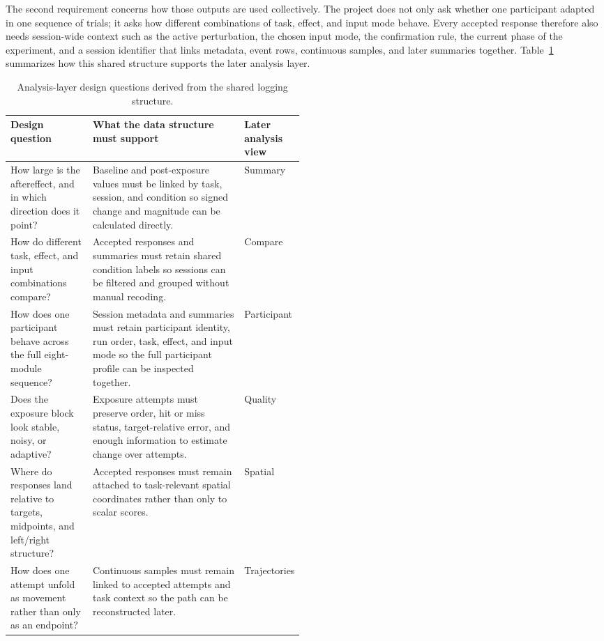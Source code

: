 The second requirement concerns how those outputs are used collectively. The project does not only ask whether one participant adapted in one sequence of trials; it asks how different combinations of task, effect, and input mode behave. Every accepted response therefore also needs session-wide context such as the active perturbation, the chosen input mode, the confirmation rule, the current phase of the experiment, and a session identifier that links metadata, event rows, continuous samples, and later summaries together. Table~\ref{tab:analysis-design-questions} summarizes how this shared structure supports the later analysis layer.

\begin{table}[H]
    \centering
    \footnotesize
    \setlength{\tabcolsep}{5pt}
    \renewcommand{\arraystretch}{1.18}
    \begin{tabularx}{\linewidth}{|
        >{\raggedright\arraybackslash}p{0.29\linewidth}|
        >{\raggedright\arraybackslash}X|
        >{\raggedright\arraybackslash}p{0.20\linewidth}|}
        \hline
        \textbf{Design question} & \textbf{What the data structure must support} & \textbf{Later analysis view} \\
        \hline
        How large is the aftereffect, and in which direction does it point? & Baseline and post-exposure values must be linked by task, session, and condition so signed change and magnitude can be calculated directly. & Summary \\
        \hline
        How do different task, effect, and input combinations compare? & Accepted responses and summaries must retain shared condition labels so sessions can be filtered and grouped without manual recoding. & Compare \\
        \hline
        How does one participant behave across the full eight-module sequence? & Session metadata and summaries must retain participant identity, run order, task, effect, and input mode so the full participant profile can be inspected together. & Participant \\
        \hline
        Does the exposure block look stable, noisy, or adaptive? & Exposure attempts must preserve order, hit or miss status, target-relative error, and enough information to estimate change over attempts. & Quality \\
        \hline
        Where do responses land relative to targets, midpoints, and left/right structure? & Accepted responses must remain attached to task-relevant spatial coordinates rather than only to scalar scores. & Spatial \\
        \hline
        How does one attempt unfold as movement rather than only as an endpoint? & Continuous samples must remain linked to accepted attempts and task context so the path can be reconstructed later. & Trajectories \\
        \hline
    \end{tabularx}
    \caption{Analysis-layer design questions derived from the shared logging structure.}
    \label{tab:analysis-design-questions}
\end{table}

